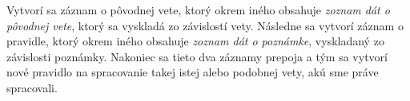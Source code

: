 Vytvorí sa záznam o pôvodnej vete, ktorý okrem iného obsahuje \textit{zoznam dát o pôvodnej vete}, ktorý sa vyskladá zo závislostí vety. Následne sa vytvorí záznam o pravidle, ktorý okrem iného obsahuje \textit{zoznam dát o poznámke}, vyskladaný zo závislosti poznámky. Nakoniec sa tieto dva záznamy prepoja a tým sa vytvorí nové pravidlo na spracovanie takej istej alebo podobnej vety, akú sme práve spracovali.


